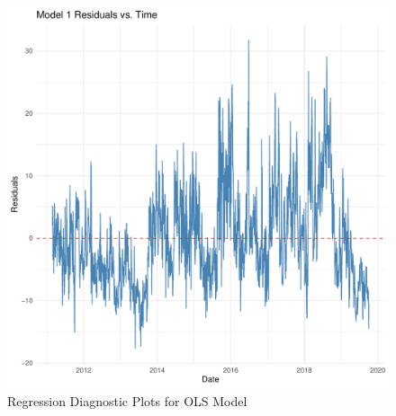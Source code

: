 \documentclass[
]{article}
\begin{document}
\begin{figure}
\centering
\includegraphics{FinalProject_files/figure-latex/model1-diagnostics-6.pdf}
\caption{Regression Diagnostic Plots for OLS Model}
\end{figure}
\end{document}
